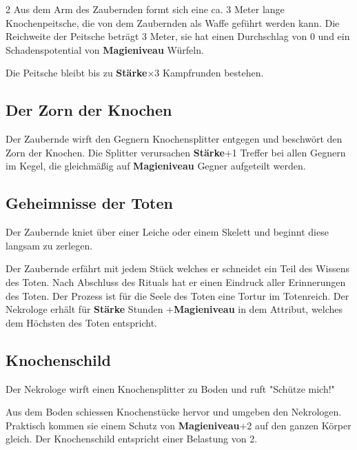 \begin{multicols*}{2}
Aus dem Arm des Zaubernden formt sich eine ca. 3 Meter lange Knochenpeitsche, die von dem Zaubernden als Waffe geführt werden kann. Die Reichweite der Peitsche beträgt 3 Meter, sie hat einen Durchschlag von 0 und ein Schadenspotential von \textbf{Magieniveau} Würfeln.

Die Peitsche bleibt bis zu \textbf{Stärke}×3 Kampfrunden bestehen.



\subsection{Der Zorn der Knochen}

Der Zaubernde wirft den Gegnern Knochensplitter entgegen und beschwört den Zorn der Knochen. Die Splitter verursachen \textbf{Stärke}+1 Treffer bei allen Gegnern im Kegel, die gleichmäßig auf \textbf{Magieniveau} Gegner aufgeteilt werden.



\subsection{Geheimnisse der Toten}

Der Zaubernde kniet über einer Leiche oder einem Skelett und beginnt diese langsam zu zerlegen.

Der Zaubernde erfährt mit jedem Stück welches er schneidet ein Teil des Wissens des Toten. Nach Abschluss des Rituals hat er einen Eindruck aller Erinnerungen des Toten. Der Prozess ist für die Seele des Toten eine Tortur im Totenreich. Der Nekrologe erhält für \textbf{Stärke} Stunden +\textbf{Magieniveau} in dem Attribut, welches dem Höchsten des Toten entspricht.



\subsection{Knochenschild}

Der Nekrologe wirft einen Knochensplitter zu Boden und ruft "Schütze mich!"

Aus dem Boden schiessen Knochenstücke hervor und umgeben den Nekrologen. Praktisch kommen sie einem Schutz von \textbf{Magieniveau}+2 auf den ganzen Körper gleich. Der Knochenschild entspricht einer Belastung von 2.


\end{multicols*}
